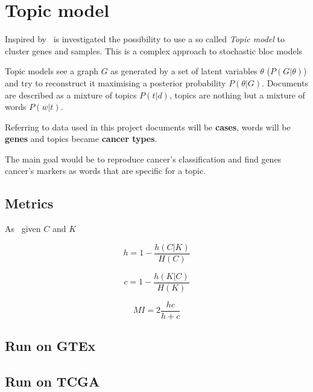 \chapter{Topic model}\label{ch:topicmodelling}
Inspired by~\cite{gerlach2018network} is investigated the possibility to use a so called \textit{Topic model} to cluster genes and samples.
This is a complex approach to stochastic bloc models~\cite{Holland1983}

Topic models see a graph $G$ as generated by a set of latent
variables $\theta$ ($P(G|\theta)$) and try to reconstruct it maximising a posterior probability $P(\theta|G)$.
Documents are described as a mixture of topics $P(t|d)$, topics are nothing but
a mixture of words $P(w|t)$.

Referring to data used in this project documents will be \textbf{cases}, words will be \textbf{genes} and topics became
\textbf{cancer types}.

The main goal would be to reproduce cancer's classification and find genes
cancer's markers as words that are specific for a topic.

\section{Metrics}
As~\cite{rosenberg2007v} given $C$ and $K$

\begin{equation}\label{eq:homogeneity}
    h=1-\frac{h(C|K)}{H(C)}
\end{equation}

\begin{equation}\label{eq:completness}
    c=1-\frac{h(K|C)}{H(K)}
\end{equation}

\begin{equation}\label{eq:mutualinformation}
    MI=2\frac{h c}{h + c}
\end{equation}

\section{Run on GTEx}

\section{Run on TCGA}


